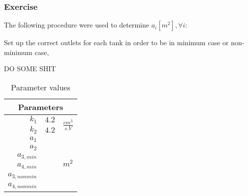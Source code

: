 \subsubsection{Exercise} 

The following procedure were used to determine $a_i \left[m^2\right], \forall i$:

\begin{shortitemize}
    \item Set up the correct outlets for each tank in order to be in minimum case or non-minimum case,
    \item DO SOME SHIT
\end{shortitemize}

\begin{table}[h!b]
    \centering
    \begin{tabular}{|r|l|c|}
        \hline
        \multicolumn{3}{|c|}{Parameters}\\
        \hline
        $k_1$           & $4.2$ & \multirow{2}{*}{$\frac{cm^3}{s.V}$}  \\
        $k_2$           & $4.2$ & \\
        \hline 
        $a_1$           &   & \multirow{6}{*}{$m^2$}  \\
        $a_2$           &   & \\
        $a_{3,min}$     &   & \\
        $a_{4,min}$     &   & \\
        $a_{3,nonmin}$  &   & \\
        $a_{4,nonmin}$  &   & \\
        \hline
    \end{tabular}
    \caption{Parameter values}
    \label{parameterDetermination}
\end{table}

